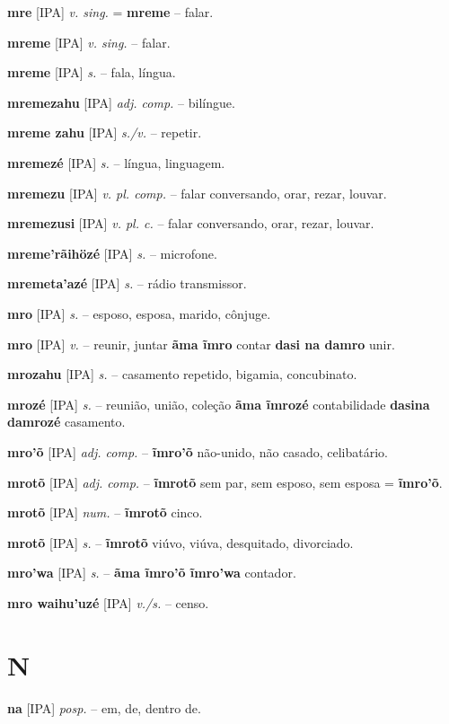 \textbf{mre} [IPA] \textit{v. sing.} = \textbf{mreme} -- falar.

\textbf{mreme} [IPA] \textit{v. sing.} -- falar.

\textbf{mreme} [IPA] \textit{s.} -- fala, língua.

\textbf{mremezahu} [IPA] \textit{adj. comp.} -- bilíngue.

\textbf{mreme zahu} [IPA] \textit{s./v.} -- repetir.

\textbf{mremezé} [IPA] \textit{s.} -- língua, linguagem.

\textbf{mremezu} [IPA] \textit{v. pl. comp.} -- falar conversando, orar, rezar, louvar.

\textbf{mremezusi} [IPA] \textit{v. pl. c.} -- falar conversando, orar, rezar, louvar.

\textbf{mreme'rãihözé} [IPA] \textit{s.} -- microfone.

\textbf{mremeta'azé} [IPA] \textit{s.} -- rádio transmissor.

\textbf{mro} [IPA] \textit{s.} -- esposo, esposa, marido, cônjuge.

\textbf{mro} [IPA] \textit{v.} -- reunir, juntar  \textbf{ãma ĩmro} contar  \textbf{dasi na damro} unir.

\textbf{mrozahu} [IPA] \textit{s.} -- casamento repetido, bigamia, concubinato.

\textbf{mrozé} [IPA] \textit{s.} -- reunião, união, coleção  \textbf{ãma ĩmrozé} contabilidade  \textbf{dasina damrozé} casamento.

\textbf{mro'õ} [IPA] \textit{adj. comp.} -- \textbf{ĩmro'õ} não-unido, não casado, celibatário.

\textbf{mrotõ} [IPA] \textit{adj. comp.} -- \textbf{ĩmrotõ} sem par, sem esposo, sem esposa = \textbf{ĩmro'õ}.

\textbf{mrotõ} [IPA] \textit{num.} -- \textbf{ĩmrotõ} cinco.

\textbf{mrotõ} [IPA] \textit{s.} -- \textbf{ĩmrotõ} viúvo, viúva, desquitado, divorciado.

\textbf{mro'wa} [IPA] \textit{s.} -- \textbf{ãma ĩmro'õ ĩmro'wa} contador.

\textbf{mro waihu'uzé} [IPA] \textit{v./s.} -- censo.


\section*{N}

\textbf{na} [IPA] \textit{posp.} -- em, de, dentro de.

